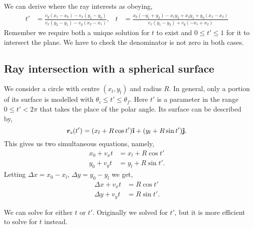 \documentclass{article}
\let\vec \bm
\newcommand{\uveci}{{\bm{\hat{\textnormal{\bfseries\i}}}}}
\newcommand{\uvecj}{{\bm{\hat{\textnormal{\bfseries\j}}}}}
\begin{document}
We can derive where the ray interests as obeying,
\begin{align}
    t'
    &=
    \frac{v_y(x_1 - x_0) - v_x(y_1 - y_0)}{v_x(y_2 - y_1) - v_y(x_2 - x_1)}, &
    t
    &=
    \frac{x_{0} \left(- y_{1} + y_{2}\right) - x_{1} y_{2} + x_{2} y_{1} + y_{0} \left(x_{1} - x_{2}\right)}{v_{x} \left(y_{1} - y_{2}\right) + v_{y} \left(- x_{1} + x_{2}\right)}
\end{align}
Remember we require both a unique solution for $t$ to exist and $0 \le t' \le 1$ for it to intersect the plane. We have to check the denominator is not zero in both cases.

\subsection{Ray intersection with a spherical surface}
We consider a circle with centre $(x_l, y_l)$ and radius $R$. In general, only a portion of its surface is modelled with $\theta_i \le t' \le \theta_f$. Here $t'$ is a parameter in the range $0 \le t' < 2\pi$ that takes the place of the polar angle. Its surface can be described by,
\begin{equation}
    \vec{r}_\mathrm{s}(t')
    =
    (x_l + R\cos t') \uveci
    +
    (y_l + R\sin t') \uvecj.
\end{equation}
This gives us two simultaneous equations, namely,
\begin{align}
    x_0 + v_x t &= x_l + R\cos t' \\
    y_0 + v_y t &= y_l + R\sin t'.
\end{align}
Letting $\Delta x = x_0 - x_l$, $\Delta y = y_0 - y_l$ we get,
\begin{align}
\label{eq:sph_simulataneous_1}
    \Delta x + v_x t &= R\cos t' \\
\label{eq:sph_simulataneous_2}
    \Delta y + v_y t &= R\sin t'.
\end{align}

We can solve for either $t$ or $t'$. Originally we solved for $t'$, but it is more efficient to solve for $t$ instead.
\end{document}
